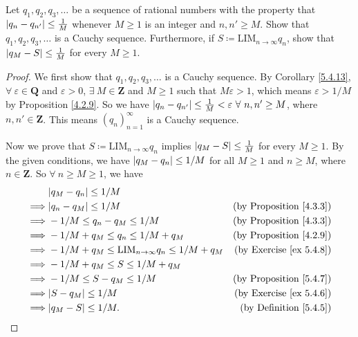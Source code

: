 \begin{exercise}\label{ex 5.5.4}
Let \(q_1, q_2, q_3, \dots\) be a sequence of rational numbers with the property that \(\abs*{q_n - q_{n'}} \leq \frac{1}{M}\) whenever \(M \geq 1\) is an integer and \(n, n' \geq M\).
Show that \(q_1, q_2, q_3, \dots\) is a Cauchy sequence.
Furthermore, if \(S \coloneqq \text{LIM}_{n \to \infty} q_n\), show that \(\abs*{q_M - S} \leq \frac{1}{M}\) for every \(M \geq 1\).
\end{exercise}

\begin{proof}
We first show that \(q_1, q_2, q_3, \dots\) is a Cauchy sequence.
By Corollary \ref{5.4.13}, \(\forall\ \varepsilon \in \mathbf{Q}\) and \(\varepsilon > 0\), \(\exists\ M \in \mathbf{Z}\) and \(M \geq 1\) such that \(M\varepsilon > 1\), which means \(\varepsilon > 1 / M\) by Proposition \ref{4.2.9}.
So we have \(\abs*{q_n - q_{n'}} \leq \frac{1}{M} < \varepsilon \ \forall\ n, n' \geq M\), where \(n, n' \in \mathbf{Z}\).
This means \((q_n)_{n = 1}^{\infty}\) is a Cauchy sequence.

Now we prove that \(S \coloneqq \text{LIM}_{n \to \infty} q_n\) implies \(\abs*{q_M - S} \leq \frac{1}{M}\) for every \(M \geq 1\).
By the given conditions, we have \(\abs*{q_M - q_n} \leq 1 / M\) for all \(M \geq 1\) and \(n \geq M\), where \(n \in \mathbf{Z}\).
So \(\forall\ n \geq M \geq 1\), we have
\begin{align*}
& \abs*{q_M - q_n} \leq 1 / M \\
\implies & \abs*{q_n - q_M} \leq 1 / M & \text{(by Proposition \ref{4.3.3})} \\
\implies & -1 / M \leq q_n - q_M \leq 1 / M & \text{(by Proposition \ref{4.3.3})} \\
\implies & -1 / M + q_M \leq q_n \leq 1 / M + q_M & \text{(by Proposition \ref{4.2.9})} \\
\implies & -1 / M + q_M \leq \text{LIM}_{n \to \infty} q_n \leq 1 / M + q_M & \text{(by Exercise \ref{ex 5.4.8})} \\
\implies & -1 / M + q_M \leq S \leq 1 / M + q_M \\
\implies & -1 / M \leq S - q_M \leq 1 / M & \text{(by Proposition \ref{5.4.7})} \\
\implies & \abs*{S - q_M} \leq 1 / M & \text{(by Exercise \ref{ex 5.4.6})} \\
\implies & \abs*{q_M - S} \leq 1 / M. & \text{(by Definition \ref{5.4.5})}
\end{align*}
\end{proof}

